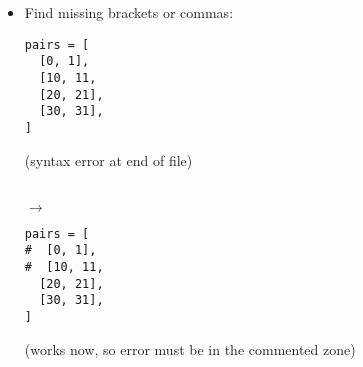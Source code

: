 \documentclass{handout}
\begin{document}
\begin{itemize}

\item Find missing brackets or commas: \\
\noindent
\begin{minipage}[t]{0.45\columnwidth}
\begin{lstlisting}
pairs = [
  [0, 1],
  [10, 11,
  [20, 21],
  [30, 31],
]
\end{lstlisting}
(syntax error at end of file)
\end{minipage}
\begin{minipage}[t]{0.05\columnwidth}
\  \\
\hspace*{1ex}$\rightarrow$
\end{minipage}
\begin{minipage}[t]{0.45\columnwidth}
\begin{lstlisting}
pairs = [
#  [0, 1],
#  [10, 11,
  [20, 21],
  [30, 31],
]
\end{lstlisting}
(works now, so error must be in the commented zone)
\end{minipage}

\end{itemize}
\end{document}
